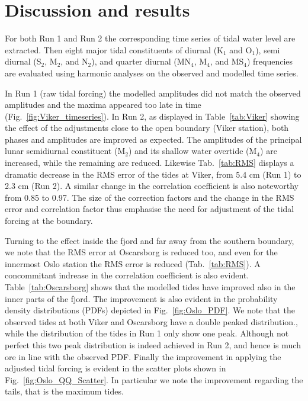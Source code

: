 \section{Discussion and results}
\label{sec:discuss}

For both Run 1 and Run 2 the corresponding time series of tidal water level are extracted. Then eight major tidal constituents of diurnal (K$_1$ and O$_1$), semi diurnal (S$_2$, M$_2$, and N$_2$), and quarter diurnal (MN$_4$, M$_4$, and MS$_4$) frequencies are evaluated using harmonic analyses on the observed and modelled time series. 

In Run 1 (raw tidal forcing) the modelled amplitudes did not match the observed amplitudes and the maxima appeared too late in time (Fig.~\ref{fig:Viker_timeseries}). In Run 2, as displayed in Table~\ref{tab:Viker} showing the effect of the adjustments close to the open boundary (Viker station), both phases and amplitudes are improved as expected. The amplitudes of the principal lunar semidiurnal constituent (M$_2$) and its shallow water overtide (M$_4$) are increased, while the remaining are reduced. Likewise Tab.~\ref{tab:RMS} displays a dramatic decrease in the RMS error of the tides at Viker, from 5.4 cm (Run 1) to 2.3 cm (Run 2). A similar change in the correlation coefficient is also noteworthy from 0.85 to 0.97. The size of the correction factors and the change in the RMS error and correlation factor thus emphasise the need for adjustment of the tidal forcing at the boundary. 

Turning to the effect inside the fjord and far away from the southern boundary, we note that the RMS error at Oscarsborg is reduced too, and even for the innermost Oslo station the RMS error is reduced (Tab.~\ref{tab:RMS}). A concommitant indrease in the correlation coefficient is also evident. Table~\ref{tab:Oscarsborg} shows that the modelled tides have improved also in the inner parts of the fjord. The improvement is also evident in the probability density distributions (PDFs) depicted in Fig.~\ref{fig:Oslo_PDF}. We note that the observed tides at both Viker and Oscarsborg have a double peaked distribution., while the distribution of the tides in Run 1 only show one peak. Although not perfect this two peak distribution is indeed achieved in Run 2, and hence is much ore in line with the observed PDF. Finally the improvement in applying the adjusted tidal forcing is evident in the scatter plots shown in Fig.~\ref{fig:Oslo_QQ_Scatter}. In particular we note the improvement regarding the tails, that is the maximum tides.  

